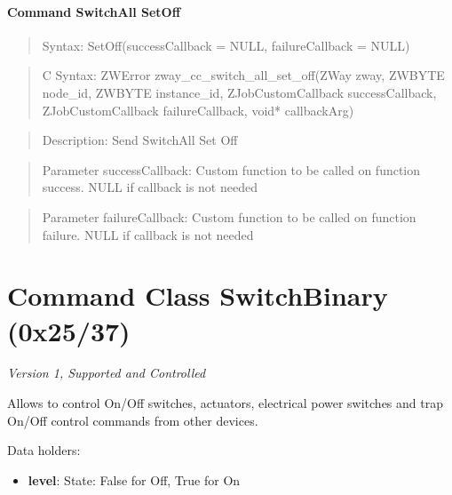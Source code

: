 \paragraph{Command SwitchAll SetOff}
\begin{quote}Syntax: SetOff(successCallback = NULL, failureCallback = NULL)\end{quote}
\begin{quote}C Syntax: ZWError zway\_cc\_switch\_all\_set\_off(ZWay zway, ZWBYTE node\_id, ZWBYTE instance\_id, ZJobCustomCallback successCallback, ZJobCustomCallback failureCallback, void* callbackArg)\end{quote}
\begin{quote}Description: Send SwitchAll Set Off\end{quote}
\begin{quote}Parameter successCallback: Custom function to be called on function success. NULL if callback is not needed\end{quote}
\begin{quote}Parameter failureCallback: Custom function to be called on function failure. NULL if callback is not needed\end{quote}



\section{Command Class SwitchBinary (0x25/37)}

\textit{Version 1, Supported and Controlled}
\newline

Allows to control On/Off switches, actuators, electrical power switches and trap On/Off control commands from other devices.
\newline

\noindent
Data holders:

\begin{itemize}
\item \textbf{level}: State: False for Off, True for On
\end{itemize}

